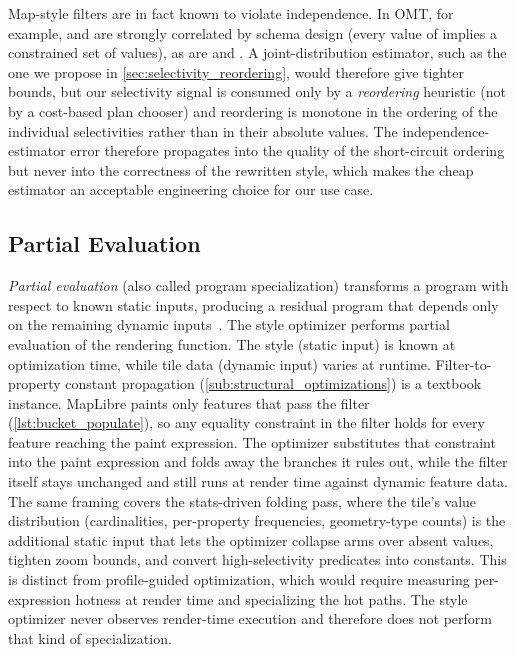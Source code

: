 Map-style filters are in fact known to violate independence.
In \ac{OMT}, for example,  and  are strongly correlated by schema design (every value of  implies a constrained set of  values), as are  and .
A joint-distribution estimator, such as the one we propose in \cref{sec:selectivity_reordering}, would therefore give tighter bounds, but our selectivity signal is consumed only by a \emph{reordering} heuristic (not by a cost-based plan chooser) and reordering is monotone in the ordering of the individual selectivities rather than in their absolute values.
The independence-estimator error therefore propagates into the quality of the short-circuit ordering but never into the correctness of the rewritten style, which makes the cheap estimator an acceptable engineering choice for our use case.

\subsection{Partial Evaluation}\label{sub:partial_eval}

\emph{Partial evaluation} (also called program specialization) transforms a program with respect to known static inputs, producing a residual program that depends only on the remaining dynamic inputs~\cite{jonesPartialEvaluationAutomatic1993}.
The style optimizer performs partial evaluation of the rendering function.
The style (static input) is known at optimization time, while tile data (dynamic input) varies at runtime.
Filter-to-property constant propagation (\cref{sub:structural_optimizations}) is a textbook instance.
MapLibre paints only features that pass the filter (\cref{lst:bucket_populate}), so any equality constraint in the filter holds for every feature reaching the paint expression.
The optimizer substitutes that constraint into the paint expression and folds away the branches it rules out, while the filter itself stays unchanged and still runs at render time against dynamic feature data.
The same framing covers the stats-driven folding pass, where the tile's value distribution (cardinalities, per-property frequencies, geometry-type counts) is the additional static input that lets the optimizer collapse  arms over absent values, tighten zoom bounds, and convert high-selectivity predicates into constants.
This is distinct from profile-guided optimization, which would require measuring per-expression hotness at render time and specializing the hot paths.
The style optimizer never observes render-time execution and therefore does not perform that kind of specialization.

